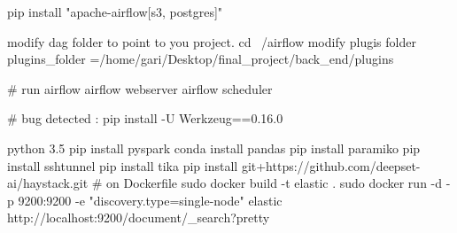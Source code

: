 pip install "apache-airflow[s3, postgres]"

modify dag folder to point to you project.
cd ~/airflow
modify plugis folder
plugins_folder =/home/gari/Desktop/final_project/back_end/plugins

# run airflow
airflow webserver
airflow scheduler

# bug detected :
pip install -U Werkzeug==0.16.0


python 3.5
pip install pyspark 
conda install pandas 
pip install paramiko
pip install sshtunnel
pip install tika
pip install git+https://github.com/deepset-ai/haystack.git
# on Dockerfile
sudo docker build -t elastic .
sudo docker run -d -p 9200:9200 -e "discovery.type=single-node" elastic
http://localhost:9200/document/_search?pretty